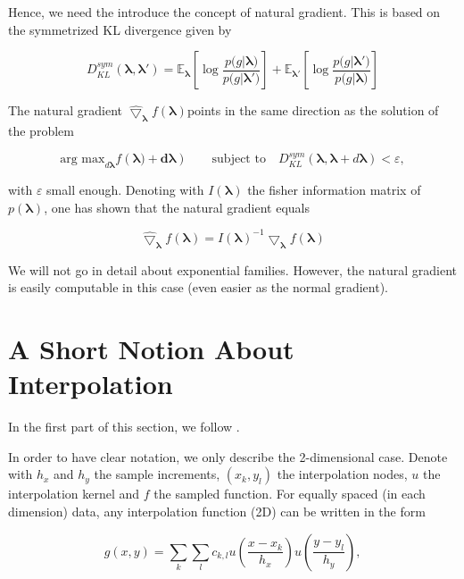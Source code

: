 \documentclass[12pt,a4paper,oneside]{book}
\begin{document}
{Hence, we need the introduce the concept of natural gradient. This is based on the symmetrized KL divergence given by

\begin{equation}
D_{KL}^{sym}(\bm{\lambda}, \bm{\lambda'}) = \mathbb{E}_{\bm{\lambda}}\left[\log{\dfrac{p(g|\bm{\lambda)}}{p(g|\bm{\lambda')}}}\right] + \mathbb{E}_{\bm{\lambda'}}\left[\log{\dfrac{p(g|\bm{\lambda')}}{p(g|\bm{\lambda)} }}\right]
\end{equation}


The natural gradient $\hat{\bigtriangledown}_{\bm{\lambda}} f(\bm{\lambda})$points in the same direction as the solution of the problem 

\begin{equation}
\text{arg max}_{d\bm{\lambda}} f(\bm{\lambda) + d\bm{\lambda}})  \qquad \text{subject to} \quad D_{KL}^{sym}(\bm{\lambda}, \bm{\lambda} + d\bm{\lambda})  < \varepsilon,
\end{equation}

with $\varepsilon$ small enough. Denoting with $I(\bm{\lambda})$ the fisher information matrix of $p(\bm{\lambda})$, one has shown that the natural gradient equals 

\begin{equation}
\hat{\bigtriangledown}_{\bm{\lambda}} f(\bm{\lambda}) = I(\bm{\lambda})^{-1} \bigtriangledown_{\bm{\lambda}} f(\bm{\lambda})
\end{equation}

We will not go in detail about exponential families. However, the natural gradient is easily computable in this case (even easier as the normal gradient).  

\section{A Short Notion About Interpolation}\label{appendix_interpolation}

In the first part of this section, we follow \cite{keys1981cubic}. 

In order to have clear notation, we only describe the 2-dimensional case. Denote with $h_x$ and $h_y$ the sample increments, $(x_k,y_l)$ the interpolation nodes, $u$ the interpolation kernel and $f$ the sampled function. For equally spaced (in each dimension) data, any interpolation function (2D) can be written in the form 

\begin{equation}\label{general_form}
g(x,y) = \sum_{k} \sum_l c_{k,l} u \left( \dfrac{x - x_k}{h_x} \right)  u \left( \dfrac{y - y_l}{h_y} \right),
\end{equation}

}
\end{document}
